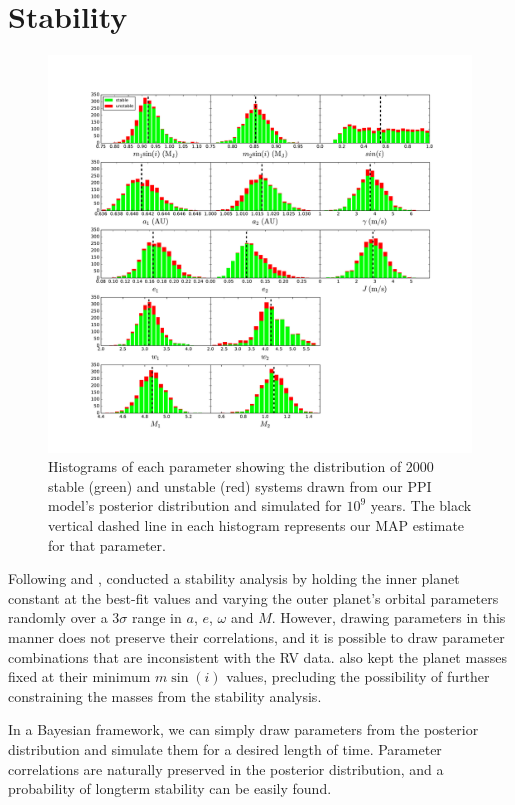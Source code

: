 \section{Stability}
\label{sec:stability}
\begin{figure}
\includegraphics[trim=4.4cm 2cm 4.5cm 0cm, width=\textwidth]{chap6/images/stability_plot_histogram}
\caption{
    Histograms of each parameter showing the distribution of 2000 stable (green) and unstable (red) systems drawn from our PPI model's posterior distribution and simulated for $10^9$ years.
The black vertical dashed line in each histogram represents our MAP estimate for that parameter. 
 }
\label{fig:stability}
\end{figure}
Following \citet{Marshall2010} and \cite{Horner2011}, \R conducted a stability analysis by holding the inner planet constant at the best-fit values and varying the outer planet's orbital parameters randomly over a 3$\sigma$ range in $a$, $e$, $\omega$ and $M$. 
However, drawing parameters in this manner does not preserve their correlations, and it is possible to draw parameter combinations that are inconsistent with the RV data. 
\R also kept the planet masses fixed at their minimum $m\sin(i)$ values, precluding the possibility of further constraining the masses from the stability analysis. 

In a Bayesian framework, we can simply draw parameters from the posterior distribution and simulate them for a desired length of time. 
Parameter correlations are naturally preserved in the posterior distribution, and a probability of longterm stability can be easily found. 

